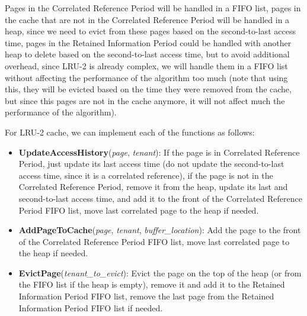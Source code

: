 Pages in the Correlated Reference Period will be handled in a FIFO list, pages in the cache
that are not in the Correlated Reference Period will be handled in a heap, since we need
to evict from these pages based on the second-to-last access time, pages in the Retained
Information Period could be handled with another heap to delete based on the second-to-last
access time, but to avoid additional overhead, since LRU-2 is already complex, we will
handle them in a FIFO list without affecting the performance of the algorithm too much
(note that using this, they will be evicted based on the time they were removed from the 
cache, but since this pages are not in the cache anymore, it will not affect much the performance
of the algorithm). 

For LRU-2 cache, we can implement each of the functions as follows:

\begin{itemize}
    \item \textbf{UpdateAccessHistory}(\textit{page}, \textit{tenant}): If the page is 
    in Correlated Reference Period, just update its last access time (do not update the 
    second-to-last access time, since it is a correlated reference), if the page is not 
    in the Correlated Reference Period, remove it from the heap, update its last and
    second-to-last access time, and add it to the front of the Correlated Reference 
    Period FIFO list, move last correlated page to the heap if needed.
    \item \textbf{AddPageToCache}(\textit{page}, \textit{tenant}, \textit{buffer\_location}): 
    Add the page to the front of the Correlated Reference Period FIFO list, move last 
    correlated page to the heap if needed.
    \item \textbf{EvictPage}(\textit{tenant\_to\_evict}): Evict the page on the top of 
    the heap (or from the FIFO list if the heap is empty), remove it and add it to the 
    Retained Information Period FIFO list, remove the last page from the Retained
    Information Period FIFO list if needed.
\end{itemize}

